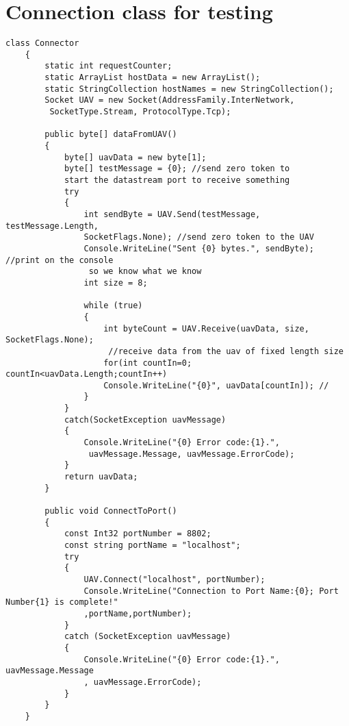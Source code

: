 \lstset{numbers=left,
numberstyle=\footnotesize, 
stepnumber=2,numbersep=5pt}
\section{Connection class for testing}

\begin{lstlisting}[caption=\texttt{Connector} for testing with console application,label=appen:connectorTest]
    class Connector
    {
        static int requestCounter;
        static ArrayList hostData = new ArrayList();
        static StringCollection hostNames = new StringCollection();
        Socket UAV = new Socket(AddressFamily.InterNetwork,
         SocketType.Stream, ProtocolType.Tcp);

        public byte[] dataFromUAV()
        {
            byte[] uavData = new byte[1];
            byte[] testMessage = {0}; //send zero token to 
            start the datastream port to receive something
            try
            {
                int sendByte = UAV.Send(testMessage, testMessage.Length, 
                SocketFlags.None); //send zero token to the UAV
                Console.WriteLine("Sent {0} bytes.", sendByte); //print on the console
                 so we know what we know
                int size = 8;

                while (true)
                {
                    int byteCount = UAV.Receive(uavData, size, SocketFlags.None);
                     //receive data from the uav of fixed length size
                    for(int countIn=0; countIn<uavData.Length;countIn++)
                    Console.WriteLine("{0}", uavData[countIn]); //
                }
            }
            catch(SocketException uavMessage)
            {
                Console.WriteLine("{0} Error code:{1}.",
                 uavMessage.Message, uavMessage.ErrorCode);
            }
            return uavData;
        }

        public void ConnectToPort()
        {
            const Int32 portNumber = 8802;
            const string portName = "localhost";
            try
            {
                UAV.Connect("localhost", portNumber);
                Console.WriteLine("Connection to Port Name:{0}; Port Number{1} is complete!"
                ,portName,portNumber);
            }
            catch (SocketException uavMessage)
            {
                Console.WriteLine("{0} Error code:{1}.", uavMessage.Message
                , uavMessage.ErrorCode);
            }
        }
    }

\end{lstlisting}